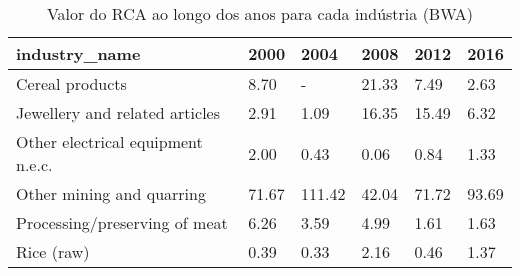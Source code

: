 \begin{table}
\centering
\caption{Valor do RCA ao longo dos anos para cada indústria (BWA)}
\begin{tabular}{p{6cm}p{1.5cm}p{1.5cm}p{1.5cm}p{1.5cm}p{1.5cm}}
\toprule
                    industry\_name &  2000 &   2004 &  2008 &  2012 &  2016 \\
\midrule
                  Cereal products &  8.70 &      - & 21.33 &  7.49 &  2.63 \\
   Jewellery and related articles &  2.91 &   1.09 & 16.35 & 15.49 &  6.32 \\
Other electrical equipment n.e.c. &  2.00 &   0.43 &  0.06 &  0.84 &  1.33 \\
        Other mining and quarring & 71.67 & 111.42 & 42.04 & 71.72 & 93.69 \\
    Processing/preserving of meat &  6.26 &   3.59 &  4.99 &  1.61 &  1.63 \\
                       Rice (raw) &  0.39 &   0.33 &  2.16 &  0.46 &  1.37 \\
\bottomrule
\end{tabular}
\end{table}
